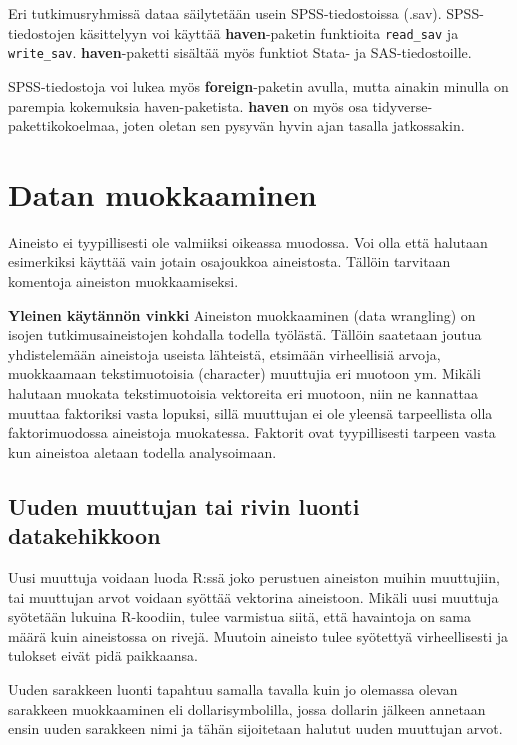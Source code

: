 \documentclass[
]{book}
\begin{document}
Eri tutkimusryhmissä dataa säilytetään usein SPSS-tiedostoissa (.sav). SPSS-tiedostojen käsittelyyn voi käyttää \textbf{haven}-paketin funktioita \texttt{read\_sav} ja \texttt{write\_sav}. \textbf{haven}-paketti sisältää myös funktiot Stata- ja SAS-tiedostoille.

SPSS-tiedostoja voi lukea myös \textbf{foreign}-paketin avulla, mutta ainakin minulla on parempia kokemuksia haven-paketista. \textbf{haven} on myös osa tidyverse-pakettikokoelmaa, joten oletan sen pysyvän hyvin ajan tasalla jatkossakin.

\hypertarget{data-wrangling}{%
\chapter{Datan muokkaaminen}\label{data-wrangling}}

Aineisto ei tyypillisesti ole valmiiksi oikeassa muodossa. Voi olla että halutaan esimerkiksi käyttää vain jotain osajoukkoa aineistosta. Tällöin tarvitaan komentoja aineiston muokkaamiseksi.

\textbf{Yleinen käytännön vinkki}
Aineiston muokkaaminen (data wrangling) on isojen tutkimusaineistojen kohdalla todella työlästä. Tällöin saatetaan joutua yhdistelemään aineistoja useista lähteistä, etsimään virheellisiä arvoja, muokkaamaan tekstimuotoisia (character) muuttujia eri muotoon ym. Mikäli halutaan muokata tekstimuotoisia vektoreita eri muotoon, niin ne kannattaa muuttaa faktoriksi vasta lopuksi, sillä muuttujan ei ole yleensä tarpeellista olla faktorimuodossa aineistoja muokatessa. Faktorit ovat tyypillisesti tarpeen vasta kun aineistoa aletaan todella analysoimaan.

\hypertarget{data-frame-wrangling}{%
\section{Uuden muuttujan tai rivin luonti datakehikkoon}\label{data-frame-wrangling}}

Uusi muuttuja voidaan luoda R:ssä joko perustuen aineiston muihin muuttujiin, tai muuttujan arvot voidaan syöttää vektorina aineistoon. Mikäli uusi muuttuja syötetään lukuina R-koodiin, tulee varmistua siitä, että havaintoja on sama määrä kuin aineistossa on rivejä. Muutoin aineisto tulee syötettyä virheellisesti ja tulokset eivät pidä paikkaansa.

Uuden sarakkeen luonti tapahtuu samalla tavalla kuin jo olemassa olevan sarakkeen muokkaaminen eli dollarisymbolilla, jossa dollarin jälkeen annetaan ensin uuden sarakkeen nimi ja tähän sijoitetaan halutut uuden muuttujan arvot.
\end{document}
